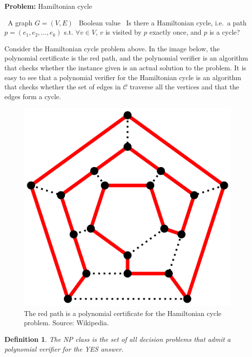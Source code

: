 \documentclass{amsart}
\theoremstyle{plain}
\newcounter{dummy-def}\numberwithin{dummy-def}{section}
\newtheorem{definition}[dummy-def]{Definition}
\newcounter{dummy-prop}\numberwithin{dummy-prop}{section}
\newcounter{dummy-corollary}\numberwithin{dummy-corollary}{section}
\newcounter{dummy-ex}\numberwithin{dummy-ex}{section}
\newcounter{dummy-eg}\numberwithin{dummy-eg}{section}
\begin{document}
\begin{algorithm}[h]
  \caption*{\textbf{Problem:} Hamiltonian cycle}
  \begin{algorithmic}[1]
    \Require\, A graph $G=(V, E)$
    \Ensure\, Boolean value
    \Description\, Is there a Hamiltonian cycle, i.e.\ a path $p=(e_1,e_2,\ldots,e_k)$ s.t. $\forall v
    \in V$, $v$ is visited by $p$ exactly once, and $p$ is a cycle?
  \end{algorithmic}
\end{algorithm}

Consider the Hamiltonian cycle problem above. In the image below, the polynomial certificate is the
red path, and the polynomial verifier is an algorithm that checks whether the instance given is an
actual solution to the problem. It is easy to see that a polynomial verifier for the Hamiltonian
cycle is an algorithm that checks whether the set of edges in $\mathcal{C}$ traverse all the
vertices and that the edges form a cycle.

\begin{figure}[h]
  \centering\includegraphics[scale=0.3]{graphs/hamiltonian.png}
  \caption{The red path is a polynomial certificate for the Hamiltonian cycle problem. Source:
  Wikipedia.}
\end{figure}

\begin{definition} The NP class is the set of all decision problems that admit a polynomial
  verifier for the YES answer.
\end{definition}
\end{document}
